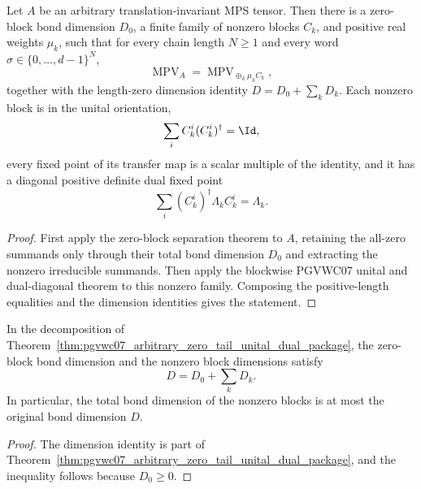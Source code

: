 \begin{theorem}%
    \label{thm:pgvwc07_arbitrary_zero_tail_unital_dual_package}
    \leanok
    Let $A$ be an arbitrary translation-invariant MPS tensor. Then there is
    a zero-block bond dimension $D_0$, a finite family of nonzero blocks
    $C_k$, and positive real weights $\mu_k$, such that for every chain
    length $N \ge 1$ and every word $\sigma \in \{0,\ldots,d-1\}^N$,
    \[
        \operatorname{MPV}_A
        =
        \operatorname{MPV}_{\oplus_k \mu_k C_k},
    \]
    together with the length-zero dimension identity $D = D_0 + \sum_k D_k$.
    Each nonzero block is in the unital orientation,
    \[
        \sum_i C_k^i(C_k^i)^\dagger=\Id ,
    \]
    every fixed point of its transfer map is a scalar multiple of the identity,
    and it has a diagonal positive definite dual fixed point
    \[
        \sum_i (C_k^i)^\dagger\Lambda_k C_k^i=\Lambda_k.
    \]
\end{theorem}
\begin{proof}\leanok
    First apply the zero-block separation theorem to $A$, retaining the
    all-zero summands only through their total bond dimension $D_0$ and
    extracting the nonzero irreducible summands. Then apply the blockwise
    PGVWC07 unital and dual-diagonal theorem to this nonzero family. Composing
    the positive-length equalities and the dimension identities gives the
    statement.
\end{proof}

\begin{theorem}%
    \label{thm:pgvwc07_arbitrary_zero_tail_unital_dual_bond_dim_bound}
    \leanok
    In the decomposition of
    Theorem~\ref{thm:pgvwc07_arbitrary_zero_tail_unital_dual_package}, the
    zero-block bond dimension and the nonzero block dimensions satisfy
    \[
        D = D_0+\sum_k D_k.
    \]
    In particular, the total bond dimension of the nonzero blocks is at most
    the original bond dimension $D$.
\end{theorem}
\begin{proof}\leanok
    The dimension identity is part of
    Theorem~\ref{thm:pgvwc07_arbitrary_zero_tail_unital_dual_package}, and the
    inequality follows because $D_0\geq 0$.
\end{proof}

